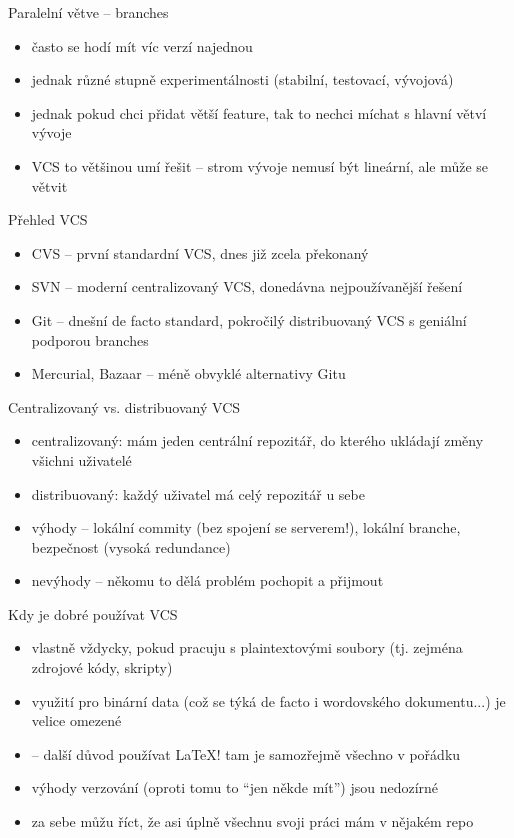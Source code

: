 \documentclass{beamer}
\begin{document}
\begin{frame}{Paralelní větve -- branches}
  \begin{itemize}
    \item často se hodí mít víc verzí najednou
    \item jednak různé stupně experimentálnosti (stabilní, testovací, vývojová)
    \item jednak pokud chci přidat větší feature, tak to nechci míchat s hlavní větví vývoje
    \item VCS to většinou umí řešit -- strom vývoje nemusí být lineární, ale může se větvit
  \end{itemize}
\end{frame}

\begin{frame}{Přehled VCS}
  \begin{itemize}
    \item CVS -- první standardní VCS, dnes již zcela překonaný
    \item SVN -- moderní centralizovaný VCS, donedávna nejpoužívanější řešení
    \item Git -- dnešní de facto standard, pokročilý distribuovaný VCS s geniální podporou branches
    \item Mercurial, Bazaar -- méně obvyklé alternativy Gitu
  \end{itemize}
\end{frame}

\begin{frame}{Centralizovaný vs. distribuovaný VCS}
  \begin{itemize}
    \item centralizovaný: mám jeden centrální repozitář, do kterého ukládají změny všichni uživatelé
    \item distribuovaný: každý uživatel má celý repozitář u sebe
    \item výhody -- lokální commity (bez spojení se serverem!), lokální branche, bezpečnost (vysoká redundance)
    \item nevýhody -- někomu to dělá problém pochopit a přijmout
  \end{itemize}
\end{frame}

\begin{frame}{Kdy je dobré používat VCS}
  \begin{itemize}
    \item vlastně vždycky, pokud pracuju s plaintextovými soubory (tj. zejména zdrojové kódy, skripty)
    \item využití pro binární data (což se týká de facto i wordovského dokumentu...) je velice omezené
    \item -- další důvod používat LaTeX! tam je samozřejmě všechno v pořádku
    \item výhody verzování (oproti tomu to ``jen někde mít'') jsou nedozírné
    \item za sebe můžu říct, že asi úplně všechnu svoji práci mám v nějakém repo
  \end{itemize}
\end{frame}
\end{document}
